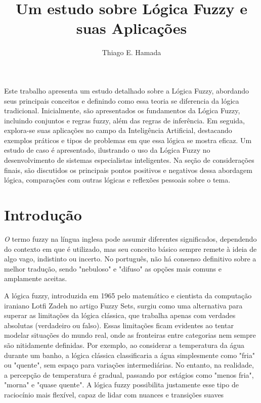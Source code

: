 \documentclass[12pt]{article}
\title{Um estudo sobre Lógica Fuzzy e suas Aplicações}
\author{Thiago E. Hamada\inst{1}}
\begin{document}
 

\maketitle
     
\begin{resumo} 
    Este trabalho apresenta um estudo detalhado sobre a Lógica Fuzzy, abordando seus principais conceitos e definindo como essa teoria se diferencia da lógica tradicional. Inicialmente, são apresentados os fundamentos da Lógica Fuzzy, incluindo conjuntos e regras fuzzy, além das regras de inferência. Em seguida, explora-se suas aplicações no campo da Inteligência Artificial, destacando exemplos práticos e tipos de problemas em que essa lógica se mostra eficaz. Um estudo de caso é apresentado, ilustrando o uso da Lógica Fuzzy no desenvolvimento de sistemas especialistas inteligentes. Na seção de considerações finais, são discutidos os principais pontos positivos e negativos dessa abordagem lógica, comparações com outras lógicas e reflexões pessoais sobre o tema. 
\end{resumo}\newpage

\section{Introdução}
\textit 
O termo fuzzy na língua inglesa pode assumir diferentes significados, dependendo do contexto em que é utilizado, mas seu conceito básico sempre remete à ideia de algo vago, indistinto ou incerto. No português, não há consenso definitivo sobre a melhor tradução, sendo "nebuloso" e "difuso" as opções mais comuns e amplamente aceitas.

A lógica fuzzy, introduzida em 1965 pelo matemático e cientista da computação iraniano Lotfi Zadeh no artigo Fuzzy Sets, surgiu como uma alternativa para superar as limitações da lógica clássica, que trabalha apenas com verdades absolutas (verdadeiro ou falso). Essas limitações ficam evidentes ao tentar modelar situações do mundo real, onde as fronteiras entre categorias nem sempre são nitidamente definidas. Por exemplo, ao considerar a temperatura da água durante um banho, a lógica clássica classificaria a água simplesmente como "fria" ou "quente", sem espaço para variações intermediárias. No entanto, na realidade, a percepção de temperatura é gradual, passando por estágios como "menos fria", "morna" e "quase quente". A lógica fuzzy possibilita justamente esse tipo de raciocínio mais flexível, capaz de lidar com nuances e transições suaves \cite{ZiaeiComparative}
\end{document}
